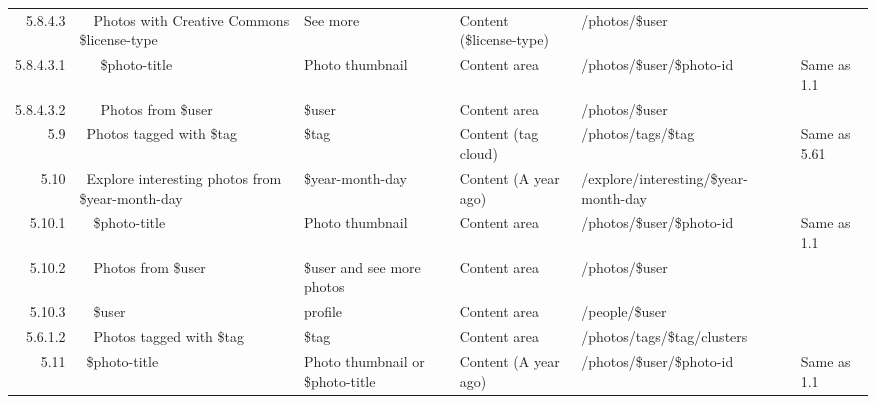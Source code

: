 \documentclass[12pt,a4paper]{article}
\begin{document}
\begin{landscape}
\begin{table}[h!b!p!]
\begin{center}
\begin{tiny}
\begin{tabular}{r|l|l|l|l|p{3cm}}
                    5.8.4.3 &
                    ~~Photos with Creative Commons \$license-type &
                    See more &
                    Content (\$license-type) &
                    /photos/\$user &
                    \\

                      5.8.4.3.1 &
                      ~~~\$photo-title &
                      Photo thumbnail &
                      Content area &
                      /photos/\$user/\$photo-id &
                      Same as 1.1 \\

                      5.8.4.3.2 &
                      ~~~Photos from \$user &
                      \$user &
                      Content area &
                      /photos/\$user &
                      \\

              5.9 &
              ~Photos tagged with \$tag &
              \$tag &
              Content (tag cloud) &
              /photos/tags/\$tag &
              Same as 5.61\\


              5.10 &
              ~Explore interesting photos from \$year-month-day &
              \$year-month-day &
              Content (A year ago) &
              /explore/interesting/\$year-month-day &
              \\

                5.10.1 &
                ~~\$photo-title &
                Photo thumbnail &
                Content area &
                /photos/\$user/\$photo-id &
                Same as 1.1 \\

                5.10.2 &
                ~~Photos from \$user &
                \$user and see more photos &
                Content area &
                /photos/\$user &
                \\

                5.10.3 &
                ~~\$user &
                profile &
                Content area &
                /people/\$user &
                \\

                5.6.1.2 &
                ~~Photos tagged with \$tag &
                \$tag &
                Content area &
                /photos/tags/\$tag/clusters &
                \\

              5.11 &
              ~\$photo-title &
              Photo thumbnail or \$photo-title &
              Content (A year ago) &
              /photos/\$user/\$photo-id &
              Same as 1.1 \\


\end{tabular}
\end{tiny}
\end{center}
\end{table}
\end{landscape}
\end{document}
